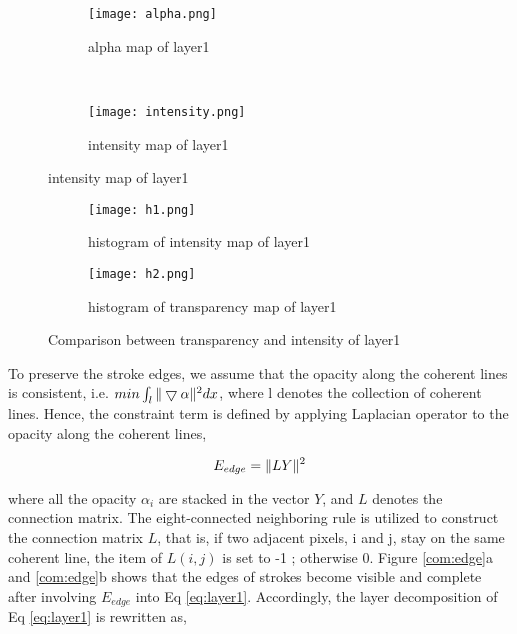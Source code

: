 \begin{figure}[H]
	\centering
	\begin{subfigure}[b]{0.3\textwidth}
		\centering
		\texttt{[image: alpha.png]}
		\caption{alpha map of layer1}

	\end{subfigure}
	~  
	\begin{subfigure}[b]{0.3\textwidth}
		\centering
		\texttt{[image: intensity.png]}
		\caption{intensity map of layer1}
 
	\end{subfigure}
\end{figure}

\begin{figure}
	\centering
	\begin{subfigure}[b]{0.7\textwidth}
		\texttt{[image: h1.png]}
		\caption{histogram of intensity map of layer1}
	\end{subfigure}
	
	\begin{subfigure}[b]{0.7\textwidth}
		\texttt{[image: h2.png]}
		\caption{histogram of transparency map of layer1}
	\end{subfigure}
	\caption{Comparison between transparency and intensity of layer1}
	\label{histo}
\end{figure}



 
To preserve the stroke edges, we assume that the opacity along the coherent lines is consistent, i.e. $min \int_{l}\Arrowvert \bigtriangledown\alpha \Arrowvert^2 dx $, where l denotes the collection of coherent lines. Hence, the constraint term is defined by applying Laplacian operator to the opacity along the coherent lines,

\begin{equation} 
E_{edge}=\Arrowvert LY \Arrowvert^2 
\end{equation} 

where all the opacity $\alpha_i$ are stacked in the vector $Y$, and $L$ denotes the connection matrix. The eight-connected neighboring rule is utilized to construct the connection matrix $L$, that is, if two adjacent pixels, i and j, stay on the same coherent line, the item of $L(i,j)$ is set to -1 ; otherwise 0. Figure \ref{com:edge}a and \ref{com:edge}b shows that the edges of strokes become visible and complete after involving $E_{edge}$ into Eq \ref{eq:layer1}.
Accordingly, the layer decomposition of Eq \ref{eq:layer1} is rewritten as,

